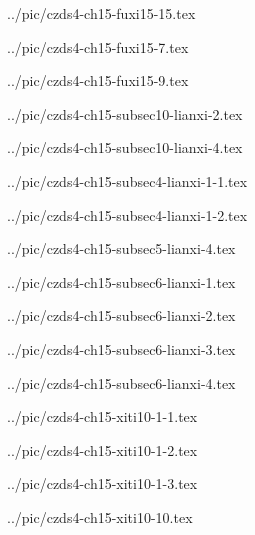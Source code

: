 ../pic/czds4-ch15-fuxi15-15.tex



../pic/czds4-ch15-fuxi15-7.tex



../pic/czds4-ch15-fuxi15-9.tex



../pic/czds4-ch15-subsec10-lianxi-2.tex



../pic/czds4-ch15-subsec10-lianxi-4.tex



../pic/czds4-ch15-subsec4-lianxi-1-1.tex



../pic/czds4-ch15-subsec4-lianxi-1-2.tex



../pic/czds4-ch15-subsec5-lianxi-4.tex



../pic/czds4-ch15-subsec6-lianxi-1.tex



../pic/czds4-ch15-subsec6-lianxi-2.tex



../pic/czds4-ch15-subsec6-lianxi-3.tex



../pic/czds4-ch15-subsec6-lianxi-4.tex



../pic/czds4-ch15-xiti10-1-1.tex



../pic/czds4-ch15-xiti10-1-2.tex



../pic/czds4-ch15-xiti10-1-3.tex



../pic/czds4-ch15-xiti10-10.tex




